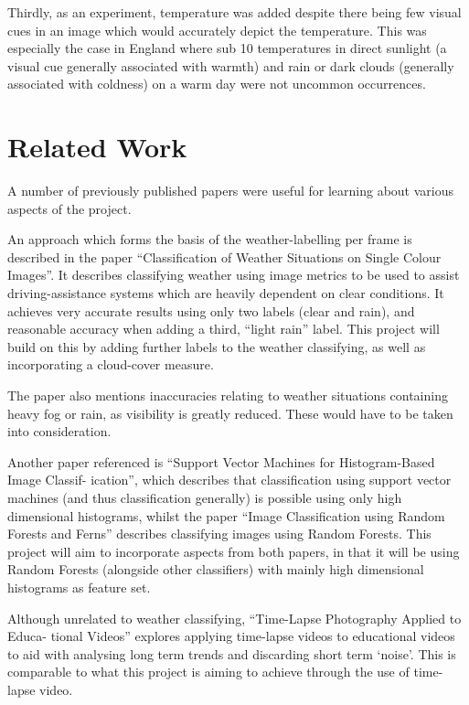 \documentclass[a4paper,12pt,twoside]{report}
\begin{document}
Thirdly, as an experiment, temperature was added despite there being few visual cues in an image which would accurately depict the temperature. This was especially the case in England where sub 10\celsius{} temperatures in direct sunlight (a visual cue generally associated with warmth) and rain or dark clouds (generally associated with coldness) on a warm day were not uncommon occurrences.

\section{Related Work}
A number of previously published papers were useful for learning about various aspects of the project.

An approach which forms the basis of the weather-labelling per frame is described in
the paper ``Classification of Weather Situations on Single Colour Images''\cite{4621205}. It 
describes classifying weather using image metrics to be used to assist driving-assistance
systems which are heavily dependent on clear conditions. It achieves very accurate results
using only two labels (clear and rain), and reasonable accuracy when adding a third,
``light rain'' label. This project will build on this by adding further labels to the weather
classifying, as well as incorporating a cloud-cover measure.

The paper also mentions inaccuracies relating to weather situations containing heavy fog
or rain, as visibility is greatly reduced. These would have to be taken into consideration.

Another paper referenced is ``Support Vector Machines for Histogram-Based Image Classif-
ication''\cite{788646}, which describes that classification using support vector machines (and thus classification generally) is possible using only high dimensional histograms, whilst the paper
``Image Classification using Random Forests and Ferns''\cite{4409066} describes classifying images using Random Forests. This project will aim to incorporate aspects from both papers, in that it will be using Random Forests (alongside other classifiers) with mainly high dimensional histograms as feature set.

Although unrelated to weather classifying, ``Time-Lapse Photography Applied to Educa-
tional Videos''\cite{6202303} explores applying time-lapse videos to educational videos to aid with
analysing long term trends and discarding short term `noise'. This is comparable to what
this project is aiming to achieve through the use of time-lapse video.
\end{document}
